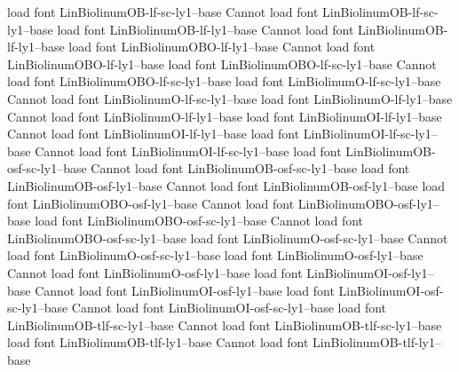 load font	LinBiolinumOB-lf-sc-ly1--base
Cannot load font LinBiolinumOB-lf-sc-ly1--base
load font	LinBiolinumOB-lf-ly1--base
Cannot load font LinBiolinumOB-lf-ly1--base
load font	LinBiolinumOBO-lf-ly1--base
Cannot load font LinBiolinumOBO-lf-ly1--base
load font	LinBiolinumOBO-lf-sc-ly1--base
Cannot load font LinBiolinumOBO-lf-sc-ly1--base
load font	LinBiolinumO-lf-sc-ly1--base
Cannot load font LinBiolinumO-lf-sc-ly1--base
load font	LinBiolinumO-lf-ly1--base
Cannot load font LinBiolinumO-lf-ly1--base
load font	LinBiolinumOI-lf-ly1--base
Cannot load font LinBiolinumOI-lf-ly1--base
load font	LinBiolinumOI-lf-sc-ly1--base
Cannot load font LinBiolinumOI-lf-sc-ly1--base
load font	LinBiolinumOB-osf-sc-ly1--base
Cannot load font LinBiolinumOB-osf-sc-ly1--base
load font	LinBiolinumOB-osf-ly1--base
Cannot load font LinBiolinumOB-osf-ly1--base
load font	LinBiolinumOBO-osf-ly1--base
Cannot load font LinBiolinumOBO-osf-ly1--base
load font	LinBiolinumOBO-osf-sc-ly1--base
Cannot load font LinBiolinumOBO-osf-sc-ly1--base
load font	LinBiolinumO-osf-sc-ly1--base
Cannot load font LinBiolinumO-osf-sc-ly1--base
load font	LinBiolinumO-osf-ly1--base
Cannot load font LinBiolinumO-osf-ly1--base
load font	LinBiolinumOI-osf-ly1--base
Cannot load font LinBiolinumOI-osf-ly1--base
load font	LinBiolinumOI-osf-sc-ly1--base
Cannot load font LinBiolinumOI-osf-sc-ly1--base
load font	LinBiolinumOB-tlf-sc-ly1--base
Cannot load font LinBiolinumOB-tlf-sc-ly1--base
load font	LinBiolinumOB-tlf-ly1--base
Cannot load font LinBiolinumOB-tlf-ly1--base
